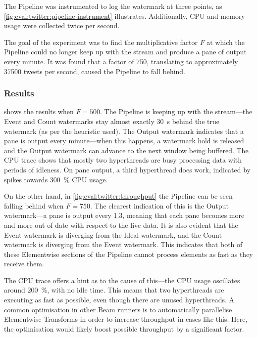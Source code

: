 The Pipeline was instrumented to log the watermark at three points, as \cref{fig:eval:twitter:pipeline-instrument} illustrates.
Additionally, CPU and memory usage were collected twice per second.

The goal of the experiment was to find the multiplicative factor $F$ at which the Pipeline could no longer keep up with the stream and produce a pane of output every minute.
It was found that a factor of \num{750}, translating to approximately \num{37500} tweets per second, caused the Pipeline to fall behind.

\subsubsection{Results}

 shows the results when $F = 500$.
The Pipeline is keeping up with the stream---the Event and Count watermarks stay almost exactly \SI{30}{\second} behind the true watermark (as per the heuristic used).
The Output watermark indicates that a pane is output every minute---when this happens, a watermark hold is released and the Output watermark can advance to the next window being buffered.
The CPU trace shows that mostly two hyperthreads are busy processing data with periods of idleness.
On pane output, a third hyperthread does work, indicated by spikes towards \SI{300}{\percent} CPU usage.

On the other hand, in \cref{fig:eval:twitter:throughput} the Pipeline can be seen falling behind when $F = 750$.
The clearest indication of this is the Output watermark---a pane is output every \SI{1.3}{\min}, meaning that each pane becomes more and more out of date with respect to the live data.
It is also evident that the Event watermark is diverging from the Ideal watermark, and the Count watermark is diverging from the Event watermark.
This indicates that both of these Elementwise sections of the Pipeline cannot process elements as fast as they receive them.

The CPU trace offers a hint as to the cause of this---the CPU usage oscillates around \SI{200}{\percent}, with no idle time.
This means that two hyperthreads are executing as fast as possible, even though there are unused hyperthreads.
A common optimisation in other Beam runners is to automatically parallelise Elementwise Transforms in order to increase throughput in cases like this.
Here, the optimisation would likely boost possible throughput by a significant factor.

